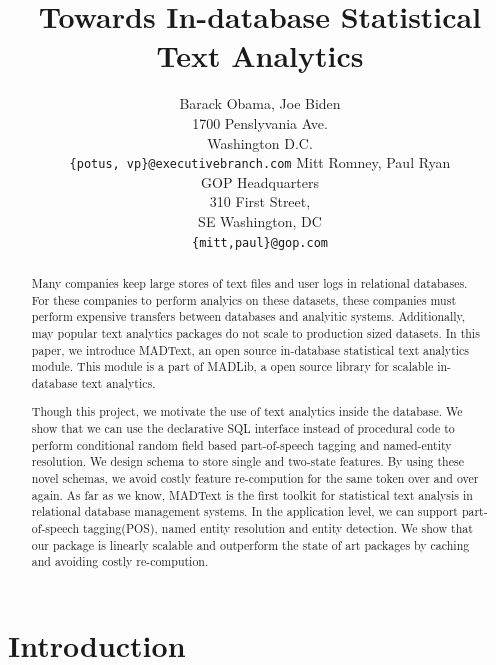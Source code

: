 \documentclass[11pt,letterpaper]{article}
\title{Towards In-database Statistical Text Analytics}
\author{Barack Obama, Joe Biden\\
1700 Penslyvania Ave.\\
Washington D.C.\\
{\tt \{potus, vp\}@executivebranch.com}
\And
Mitt Romney, Paul Ryan\\
GOP Headquarters\\
310 First Street,\\
SE Washington, DC\\
{\tt \{mitt,paul\}@gop.com}
}
\date{}
\begin{document}
\maketitle
\begin{abstract}
Many companies keep large stores of text files and user logs in relational databases.
For these companies to perform analyics on these datasets, these companies must perform 
expensive transfers between databases and analyitic systems.
Additionally, may popular text analytics packages do not scale to production sized datasets.
In this paper, we introduce MADText, an open source in-database statistical text analytics module.
This module is a part of MADLib, a open source library for scalable in-database text analytics. 

Though this project, we motivate the use of text analytics inside the database.
We show that we can use the declarative SQL interface instead of procedural code to perform 
conditional random field based part-of-speech tagging and named-entity resolution. 
We design schema to store single and two-state features.
By using these novel schemas, we avoid costly feature re-compution for the same token over and over again.  
As far as we know, MADText is the first toolkit for statistical text analysis in relational database management systems.  
In the application level, we can support part-of-speech tagging(POS), named entity resolution and entity detection.  
We show that our package is linearly scalable and outperform the state of art packages by caching and avoiding costly re-compution.
\end{abstract}

\section{Introduction}
\end{document}
